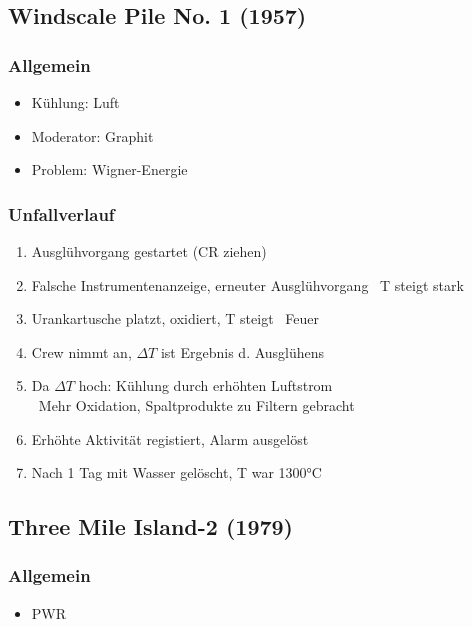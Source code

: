 \documentclass[12pt]{article}
\begin{document}
\subsection{Windscale Pile No. 1 (1957)}

\subsubsection{Allgemein}
\begin{itemize}
  \item Kühlung: Luft
  \item Moderator: Graphit
  \item Problem: Wigner-Energie
\end{itemize}

\subsubsection{Unfallverlauf}
\begin{enumerate}
  \item Ausglühvorgang gestartet (CR ziehen)
  \item Falsche Instrumentenanzeige, erneuter Ausglühvorgang \textrightarrow\ T steigt stark
  \item Urankartusche platzt, oxidiert, T steigt \textrightarrow\ Feuer
  \item Crew nimmt an, \(\Delta T\) ist Ergebnis d. Ausglühens
  \item Da \(\Delta T\) hoch: Kühlung durch erhöhten Luftstrom\\
  \textrightarrow\ Mehr Oxidation, Spaltprodukte zu Filtern gebracht
  \item Erhöhte Aktivität registiert, Alarm ausgelöst
  \item Nach 1 Tag mit Wasser gelöscht, T war 1300°C
\end{enumerate}

\subsection{Three Mile Island-2 (1979)}

\subsubsection{Allgemein}
\begin{itemize}
  \item PWR
\end{itemize}
\end{document}
